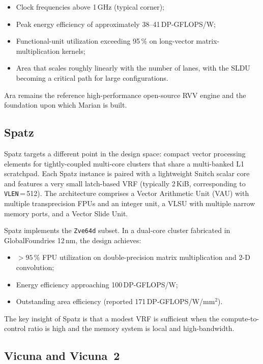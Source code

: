 \documentclass[11pt,a4paper]{article}
\begin{document}
\begin{itemize}
  \item Clock frequencies above 1\,GHz (typical corner);
  \item Peak energy efficiency of approximately 38--41\,DP-GFLOPS/W;
  \item Functional-unit utilization exceeding 95\,\% on long-vector matrix-multiplication kernels;
  \item Area that scales roughly linearly with the number of lanes, with the SLDU becoming a critical path for large configurations.
\end{itemize}

Ara remains the reference high-performance open-source RVV engine and the foundation upon which Marian is built.

\subsection{Spatz}

Spatz targets a different point in the design space: compact vector processing elements for tightly-coupled multi-core clusters that share a multi-banked L1 scratchpad. Each Spatz instance is paired with a lightweight Snitch scalar core and features a very small latch-based VRF (typically 2\,KiB, corresponding to \texttt{VLEN}\,=\,512). The architecture comprises a Vector Arithmetic Unit (VAU) with multiple transprecision FPUs and an integer unit, a VLSU with multiple narrow memory ports, and a Vector Slide Unit.

Spatz implements the \texttt{Zve64d} subset. In a dual-core cluster fabricated in GlobalFoundries 12\,nm, the design achieves:

\begin{itemize}
  \item $>95\,\%$ FPU utilization on double-precision matrix multiplication and 2-D convolution;
  \item Energy efficiency approaching 100\,DP-GFLOPS/W;
  \item Outstanding area efficiency (reported 171\,DP-GFLOPS/W/mm$^2$).
\end{itemize}

The key insight of Spatz is that a modest VRF is sufficient when the compute-to-control ratio is high and the memory system is local and high-bandwidth.

\subsection{Vicuna and Vicuna~2}
\end{document}
